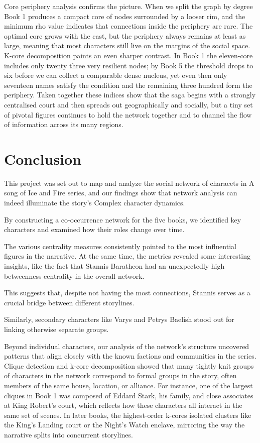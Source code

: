 \documentclass[12pt, a4paper]{article}
\begin{document}
Core periphery analysis confirms the picture. 
When we split the graph by degree Book 1 produces a compact core of nodes surrounded by a looser rim, and the minimum rho value indicates that connections inside the periphery are rare. The optimal core grows with the cast, but the periphery always remains at least as large, meaning that most characters still live on the margins of the social space. 
K-core decomposition paints an even sharper contrast. 
In Book 1 the eleven-core includes only twenty three very resilient nodes; by Book 5 the threshold drops to six before we can collect a comparable dense nucleus, yet even then only seventeen names satisfy the condition and the remaining three hundred form the periphery. Taken together these indices show that the saga begins with a strongly centralised court and then spreads out geographically and socially, but a tiny set of pivotal figures continues to hold the network together and to channel the flow of information across its many regions.
  
\section{Conclusion}
\label{conclusion}

This project was set out to map and analyze the social network of characets in A song of Ice and Fire series, and our findings show that network analysis can indeed illuminate the story's Complex character dynamics.

By constructing a co-occurrence network for the five books, we identified key characters and examined how their roles change over time.

The various centrality measures consistently pointed to the most influential figures in the narrative.  At the same time, the metrics revealed some interesting insights, like the fact that Stannis Baratheon had an unexpectedly high betweenness centrality in the overall network.

This suggests that, despite not  having the most connections, Stannis serves as a crucial bridge between different storylines.

Similarly, secondary characters like Varys and Petrys Baelish stood out for linking otherwise separate groups.



Beyond individual characters, our analysis of the network’s structure uncovered patterns that align closely with the known factions and communities in the series. 
Clique detection and k-core decomposition showed that many tightly knit groups of characters in the network correspond to formal groups in the story,
 often members of the same house, location, or alliance. 
 For instance, one of the largest cliques in Book 1 was composed of Eddard Stark, his family, and close associates at King Robert’s court, 
 which reflects how these characters all interact in the same set of scenes. 
 In later books, the highest-order k-cores isolated clusters like the King’s Landing court or the Night’s Watch enclave, 
 mirroring the way the narrative splits into concurrent storylines. 
\end{document}
